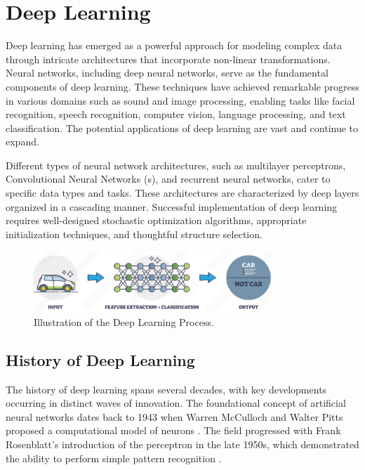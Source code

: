 \section{Deep Learning}
\label{sec:dl}
Deep learning has emerged as a powerful approach for modeling complex data through intricate architectures that incorporate non-linear transformations. Neural networks, including deep neural networks, serve as the fundamental components of deep learning. These techniques have achieved remarkable progress in various domains such as sound and image processing, enabling tasks like facial recognition, speech recognition, computer vision, language processing, and text classification. The potential applications of deep learning are vast and continue to expand.

Different types of neural network architectures, such as multilayer perceptrons, Convolutional Neural Networks (s), and recurrent neural networks, cater to specific data types and tasks. These architectures are characterized by deep layers organized in a cascading manner. Successful implementation of deep learning requires well-designed stochastic optimization algorithms, appropriate initialization techniques, and thoughtful structure selection.

\begin{figure}[H]
  \centering
  \includegraphics[width=0.8\textwidth]{Images/Chapter1/dl.png}
  \caption{Illustration of the Deep Learning Process. \cite{alltius2025deeplearning}}
  \label{fig:dl}
\end{figure}

\subsection{History of Deep Learning}
\label{sec:dl_history}
The history of deep learning spans several decades, with key developments occurring in distinct waves of innovation. The foundational concept of artificial neural networks dates back to 1943 when Warren McCulloch and Walter Pitts proposed a computational model of neurons \cite{mcculloch1943logical}. The field progressed with Frank Rosenblatt's introduction of the perceptron in the late 1950s, which demonstrated the ability to perform simple pattern recognition \cite{rosenblatt1958perceptron}.

